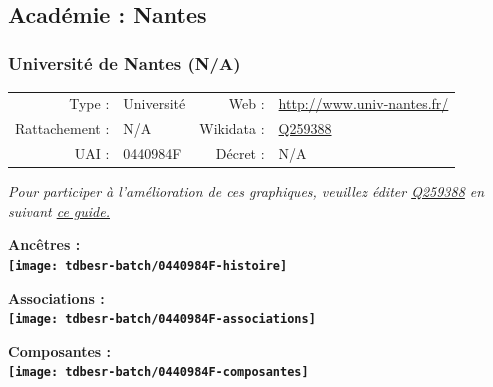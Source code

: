 \documentclass[12pt,french,]{article}
\begin{document}
\ifoddpage ~\newpage \fi   

\hypertarget{acaduxe9mie-nantes}{%
\subsection{Académie : Nantes}\label{acaduxe9mie-nantes}}

\hypertarget{universituxe9-de-nantes-na}{%
\subsubsection{Université de Nantes
(N/A)}\label{universituxe9-de-nantes-na}}

\begin{tabular*}{\textwidth}{rp{5cm}rl}  
\hline  
Type : & Université & Web : &\href{http://www.univ-nantes.fr/}{http://www.univ-nantes.fr/} \\  
Rattachement : & N/A & Wikidata : & \href{https://www.wikidata.org/entity/Q259388}{Q259388} \\  
UAI : & 0440984F & Décret : & N/A \\  
\hline  
\end{tabular*}

\textit{\scriptsize Pour participer à l'amélioration de ces graphiques, veuillez éditer  \href{https://www.wikidata.org/entity/Q259388}{Q259388}  en suivant \href{https://github.com/cpesr/wikidataESR/blob/master/Rmd/wikidataESR.md}{ce guide.}}

\vspace{1cm}  
\begin{minipage}[b]{0.50\textwidth}\begin{center} \bf Ancêtres : \\  
\texttt{[image: tdbesr-batch/0440984F-histoire]} \end{center}\end{minipage}\begin{minipage}[b]{0.50\textwidth}\begin{center} \bf Associations : \\  
\texttt{[image: tdbesr-batch/0440984F-associations]} \end{center}\end{minipage}

\hrulefill

\begin{center} \bf Composantes : \\  
\texttt{[image: tdbesr-batch/0440984F-composantes]} \end{center}
\end{document}
